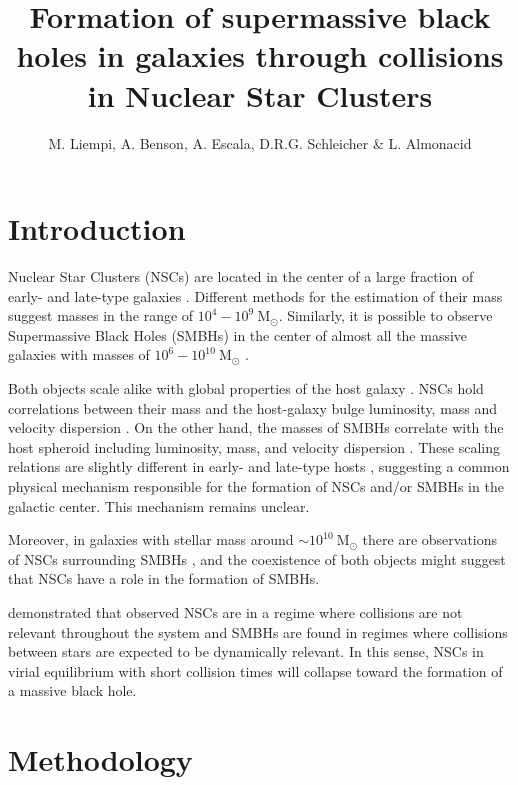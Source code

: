 \documentclass[baaa]{baaa}
\title{Formation of supermassive black holes in galaxies through collisions in Nuclear Star Clusters}
\author{
M. Liempi\inst{1},
A. Benson\inst{2},
A. Escala\inst{3},
D.R.G. Schleicher\inst{1}
\&
L. Almonacid\inst{1}
}
\institute{
Departamento de Astronom\'ia, Universidad de Concepci\'on, Chile
\and 
Carnegie Observatories, EE.UU.
\and 
Departamento de Astronom\'ia, Universidad de Chile, Chile 
}
\begin{document}
\maketitle
\section{Introduction}\label{iIntro}


Nuclear Star Clusters (NSCs) are located in the center of a large fraction of early- and late-type galaxies \citep[e.g.,][]{PHILLIPS1996,DURRELL1997,BOKER2002,BOKER2004,COTE2006,GEORGIEV2009,NEUMAYER2011,HOYER2021}. Different methods for the estimation of their mass suggest masses in the range of $10^4-10^9~\mathrm{M}_\odot$. Similarly, it is possible to observe Supermassive Black Holes (SMBHs) in the center of almost all the massive galaxies \citep{KORMENDY2013} with masses of $10^6-10^{10}~\mathrm{M}_\odot$ \citep{NATARAJAN2009,GULTEKIN2009,VOLONTERI2010,RUSLI2013,PACUCCI2017}.

Both objects scale alike with global properties of the host galaxy \citep[e.g.][]{GEORGIEV2016}. NSCs hold correlations between their mass and the host-galaxy bulge luminosity, mass and velocity dispersion \citep{FERRARESE2006,WEHNER2006,ERWIN2012}. On the other hand, the masses of SMBHs correlate with the host spheroid including luminosity, mass, and velocity dispersion \citep{SETH2008,KORMENDY2013,REINES2015,BENTZ2018}. These scaling relations are slightly different in early- and late-type hosts \citep{ERWIN2012}, suggesting a common physical mechanism responsible for the formation of NSCs and/or SMBHs in the galactic center. This mechanism remains unclear.

Moreover, in galaxies with stellar mass around $\sim 10^{10}~\mathrm{M}_\odot$ there are observations of NSCs surrounding SMBHs \citep{FLIPPENKO2003,SETH2008,SETH2010,NEUMAYER2012,NGUYEN2019}, and the coexistence of both objects might suggest that NSCs have a role in the formation of SMBHs.

\cite{ESCALA2021} demonstrated that observed NSCs are in a regime where collisions are not relevant throughout the system and SMBHs are found in regimes where collisions between stars are expected to be dynamically relevant.  In this sense, NSCs in virial equilibrium with short collision times will collapse toward the formation of a massive black hole.
                                                
\section{Methodology}
\end{document}

